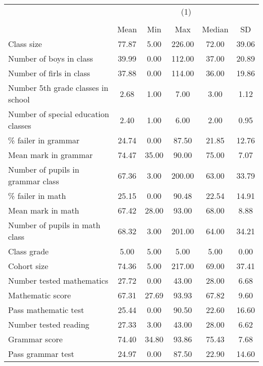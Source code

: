 {
\def\sym#1{\ifmmode^{#1}\else\(^{#1}\)\fi}
\begin{tabular}{l*{1}{ccccc}}
\hline\hline
                    &\multicolumn{5}{c}{(1)}                                         \\
                    &\multicolumn{5}{c}{}                                            \\
                    &        Mean&         Min&         Max&      Median&          SD\\
\hline
Class size          &       77.87&        5.00&      226.00&       72.00&       39.06\\
Number of boys in class&       39.99&        0.00&      112.00&       37.00&       20.89\\
Number of firls in class&       37.88&        0.00&      114.00&       36.00&       19.86\\
Number 5th grade classes in school&        2.68&        1.00&        7.00&        3.00&        1.12\\
Number of special education classes&        2.40&        1.00&        6.00&        2.00&        0.95\\
\% failer in grammar&       24.74&        0.00&       87.50&       21.85&       12.76\\
Mean mark in grammar&       74.47&       35.00&       90.00&       75.00&        7.07\\
Number of pupils in grammar class&       67.36&        3.00&      200.00&       63.00&       33.79\\
\% failer in math   &       25.15&        0.00&       90.48&       22.54&       14.91\\
Mean mark in math   &       67.42&       28.00&       93.00&       68.00&        8.88\\
Number of pupils in math class&       68.32&        3.00&      201.00&       64.00&       34.21\\
Class grade         &        5.00&        5.00&        5.00&        5.00&        0.00\\
Cohort size         &       74.36&        5.00&      217.00&       69.00&       37.41\\
Number tested mathematics&       27.72&        0.00&       43.00&       28.00&        6.68\\
Mathematic score    &       67.31&       27.69&       93.93&       67.82&        9.60\\
Pass mathematic test&       25.44&        0.00&       90.50&       22.60&       16.60\\
Number tested reading&       27.33&        3.00&       43.00&       28.00&        6.62\\
Grammar score       &       74.40&       34.80&       93.86&       75.43&        7.68\\
Pass grammar test   &       24.97&        0.00&       87.50&       22.90&       14.60\\
\hline\hline
\end{tabular}
}
